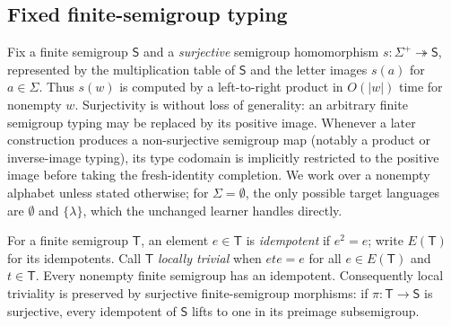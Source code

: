 \documentclass[11pt,a4paper]{article}
\theoremstyle{remark}
\theoremstyle{plain}
\begin{document}
\subsection{Fixed finite-semigroup typing}\label{sec:fixed-typing}
Fix a finite semigroup $\mathsf S$ and a \emph{surjective}
semigroup homomorphism $s:\Sigma^+\twoheadrightarrow\mathsf S$,
represented by the multiplication table of $\mathsf S$
and the letter images $s(a)$ for $a\in\Sigma$.
Thus $s(w)$ is computed by a left-to-right product in
$O(|w|)$ time for nonempty $w$.
Surjectivity is without loss of generality: an arbitrary
finite semigroup typing may be replaced by its positive image.
Whenever a later construction produces a non-surjective
semigroup map (notably a product or inverse-image typing),
its type codomain is implicitly restricted to the positive
image before taking the fresh-identity completion.
We work over a nonempty alphabet unless stated otherwise;
for $\Sigma=\emptyset$, the only possible target languages
are $\emptyset$ and $\{\lambda\}$, which the unchanged learner
handles directly.

For a finite semigroup $\mathsf T$, an element
$e\in\mathsf T$ is \emph{idempotent} if $e^2=e$;
write $E(\mathsf T)$ for its idempotents.
Call $\mathsf T$ \emph{locally trivial} when
$ete=e$ for all $e\in E(\mathsf T)$ and $t\in\mathsf T$.
Every nonempty finite semigroup has an idempotent.
Consequently local triviality is preserved by
surjective finite-semigroup morphisms:
if $\pi:\mathsf T\to\mathsf S$ is surjective,
every idempotent of $\mathsf S$ lifts to one in
its preimage subsemigroup.
\end{document}
